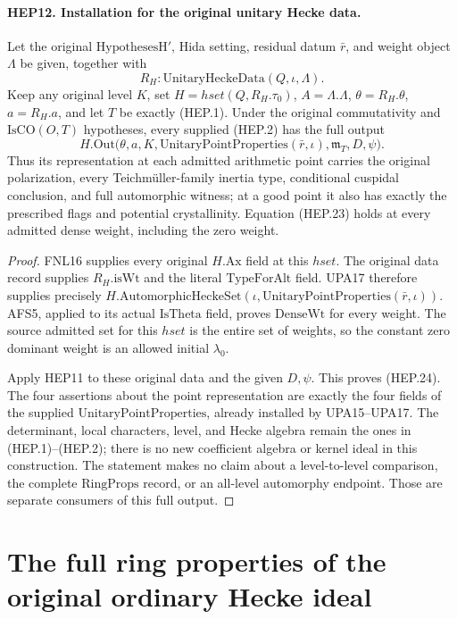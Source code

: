 \documentclass[11pt,a4paper]{article}
\numberwithin{equation}{section}
\theoremstyle{remark}\newtheorem{remark}[theorem]{Remark}
\begin{document}
\paragraph{HEP12. Installation for the original unitary Hecke data.}
\label{claim:HEP12}
Let the original $\mathrm{HypothesesH'}$, Hida setting, residual
datum $\bar r$, and weight object $\Lambda$ be given, together with
\[
                 R_H:\mathrm{UnitaryHeckeData}(Q,\iota,\Lambda).
\]
Keep any original level $K$, set
$H=hset(Q,R_H.\tau_0)$, $A=\Lambda.\Lambda$,
$\theta=R_H.\theta$, $a=R_H.a$, and let $T$ be exactly (HEP.1).
Under the original commutativity and $\mathrm{IsCO}(O,T)$ hypotheses,
every supplied (HEP.2) has the full output
\[
 H.\mathrm{Out}\bigl(\theta,a,K,
       \mathrm{UnitaryPointProperties}(\bar r,\iota),
       \mathfrak m_T,D,\psi\bigr).
 \tag{HEP.24}
\]
Thus its representation at each admitted arithmetic point carries
the original polarization, every Teichm\"uller-family inertia type,
conditional cuspidal conclusion, and full automorphic witness;
at a good point it also has exactly the prescribed flags and
potential crystallinity.  Equation (HEP.23) holds at every admitted
dense weight, including the zero weight.
\begin{proof}
FNL16 supplies every original $H.\mathrm{Ax}$ field at this
$hset$.  The original data record supplies
$R_H.\mathrm{isWt}$ and the literal $\mathrm{TypeForAlt}$ field.
UPA17 therefore supplies precisely
$H.\mathrm{AutomorphicHeckeSet}
(\iota,\mathrm{UnitaryPointProperties}(\bar r,\iota))$.
AFS5, applied to its actual $\mathrm{IsTheta}$ field, proves
$\mathrm{DenseWt}$ for every weight.  The source admitted set
for this $hset$ is the entire set of weights, so the constant zero
dominant weight is an allowed initial $\lambda_0$.

Apply HEP11 to these original data and the given $D,\psi$.
This proves (HEP.24).  The four assertions about the point
representation are exactly the four fields of the supplied
$\mathrm{UnitaryPointProperties}$, already installed by UPA15--UPA17.
The determinant, local characters, level, and Hecke algebra remain
the ones in (HEP.1)--(HEP.2); there is no new coefficient algebra
or kernel ideal in this construction.  The statement makes no
claim about a level-to-level comparison, the complete
$\mathrm{RingProps}$ record, or an all-level automorphy endpoint.
Those are separate consumers of this full output.
\end{proof}


\section{The full ring properties of the original ordinary Hecke ideal}
\label{sec:ring-properties-v44}
\end{document}

